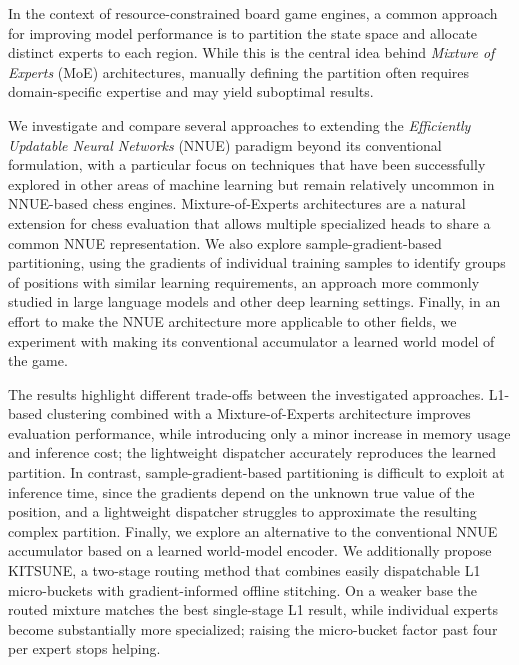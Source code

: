 
In the context of resource-constrained board game engines, a common approach for improving model performance is to partition the state space and allocate distinct experts to each region. While this is the central idea behind \emph{Mixture of Experts} (MoE) architectures, manually defining the partition often requires domain-specific expertise and may yield suboptimal results. 

We investigate and compare several approaches to extending the \emph{Efficiently Updatable Neural Networks} (NNUE) paradigm beyond its conventional formulation, with a particular focus on techniques that have been successfully explored in other areas of machine learning but remain relatively uncommon in NNUE-based chess engines. Mixture-of-Experts architectures are a natural extension for chess evaluation that allows multiple specialized heads to share a common NNUE representation. We also explore sample-gradient-based partitioning, using the gradients of individual training samples to identify groups of positions with similar learning requirements, an approach more commonly studied in large language models and other deep learning settings. Finally, in an effort to make the NNUE architecture more applicable to other fields, we experiment with making its conventional accumulator a learned world model of the game.

The results highlight different trade-offs between the investigated approaches. L1-based clustering combined with a Mixture-of-Experts architecture improves evaluation performance, while introducing only a minor increase in memory usage and inference cost; the lightweight dispatcher accurately reproduces the learned partition. In contrast, sample-gradient-based partitioning is difficult to exploit at inference time, since the gradients depend on the unknown true value of the position, and a lightweight dispatcher struggles to approximate the resulting complex partition. 
Finally, we explore an alternative to the conventional NNUE accumulator based on a learned world-model encoder. We additionally propose KITSUNE, a two-stage routing method that combines easily dispatchable L1 micro-buckets with gradient-informed offline stitching. On a weaker base the routed mixture matches the best single-stage L1 result, while individual experts become substantially more specialized; raising the micro-bucket factor past four per expert stops helping.
